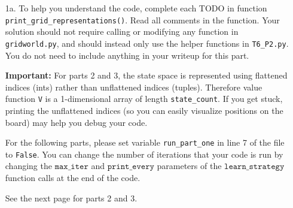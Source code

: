 \documentclass[submit]{harvardml}
\begin{document}
\begin{problem}
\begin{enumerate}

\item[1a.]To help you understand the code, complete each TODO in function \texttt{print\_grid\_representations()}. Read all comments in the function.  Your solution should not require calling or modifying any function in \texttt{gridworld.py}, and should instead only use the helper functions in \texttt{T6\_P2.py}.  You do not need to include anything in your writeup for this part.

\textbf{Important: } For parts 2 and 3, the state space is represented using flattened indices (ints) rather than unflattened indices (tuples).  Therefore value function \texttt{V} is a 1-dimensional array of length \texttt{state\_count}.  If you get stuck, printing the unflattened indices (so you can easily visualize positions on the board) may help you debug your code.

For the following parts, please set variable \texttt{run\_part\_one} in line 7 of the file to \texttt{False}.  You can change the number of iterations that your code is run by changing the $\texttt{max\_iter}$ and $\texttt{print\_every}$ parameters of the $\texttt{learn\_strategy}$ function calls at the end of the code.

See the next page for parts 2 and 3.

\end{enumerate}
\end{problem}
\newpage
\end{document}
